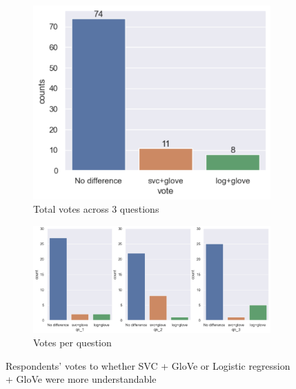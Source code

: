 \begin{figure}[!ht]
  \centering
    \begin{subfigure}[b]{0.75\textwidth}
      \includegraphics[width=1\linewidth]{figures/part4_votes.png}
      \caption{Total votes across 3 questions}
    \end{subfigure}
    \hfill
    \centering
    \begin{subfigure}[b]{1\textwidth}
      \includegraphics[width=1\linewidth]{figures/part_4_votes_1.png}
      \caption{Votes per question}
    \end{subfigure}
    \caption{Respondents' votes to whether SVC + GloVe or Logistic regression + GloVe were more understandable}
    \label{fig:part4}
\end{figure}

